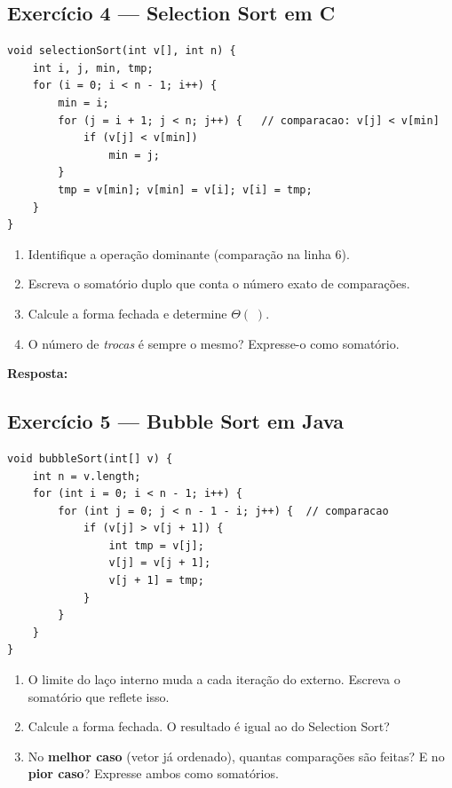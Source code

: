 \documentclass[12pt, a4paper]{article}
\newenvironment{resposta}{%
    \begin{mdframed}[linecolor=black!30, backgroundcolor=white,
                     innertopmargin=10pt, innerbottommargin=30pt,
                     skipabove=6pt]
    \textbf{Resposta:}\\[4pt]
}{%
    \end{mdframed}
}
\begin{document}
\subsection*{Exercício 4 — Selection Sort em C}

\begin{lstlisting}[style=cstyle]
void selectionSort(int v[], int n) {
    int i, j, min, tmp;
    for (i = 0; i < n - 1; i++) {
        min = i;
        for (j = i + 1; j < n; j++) {   // comparacao: v[j] < v[min]
            if (v[j] < v[min])
                min = j;
        }
        tmp = v[min]; v[min] = v[i]; v[i] = tmp;
    }
}
\end{lstlisting}

\begin{enumerate}[label=(\alph*)]
    \item Identifique a operação dominante (comparação na linha 6).
    \item Escreva o somatório duplo que conta o número exato de comparações.
    \item Calcule a forma fechada e determine $\Theta(\;)$.
    \item O número de \textit{trocas} é sempre o mesmo? Expresse-o como somatório.
\end{enumerate}

\begin{resposta}
\vspace{4cm}
\end{resposta}

\subsection*{Exercício 5 — Bubble Sort em Java}

\begin{lstlisting}[style=javastyle]
void bubbleSort(int[] v) {
    int n = v.length;
    for (int i = 0; i < n - 1; i++) {
        for (int j = 0; j < n - 1 - i; j++) {  // comparacao
            if (v[j] > v[j + 1]) {
                int tmp = v[j];
                v[j] = v[j + 1];
                v[j + 1] = tmp;
            }
        }
    }
}
\end{lstlisting}

\begin{enumerate}[label=(\alph*)]
    \item O limite do laço interno muda a cada iteração do externo. Escreva o somatório que reflete isso.
    \item Calcule a forma fechada. O resultado é igual ao do Selection Sort?
    \item No \textbf{melhor caso} (vetor já ordenado), quantas comparações são feitas? E no \textbf{pior caso}? Expresse ambos como somatórios.
\end{enumerate}
\end{document}
